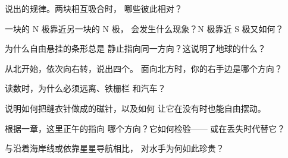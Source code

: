 \begin{exercise}[$\star$]\label{exo:g4:magnets-and-compass:2}
说出的规律。两块相互吸合时，
哪些彼此相对？
\end{exercise}

\begin{exercise}[$\star$]\label{exo:g4:magnets-and-compass:3}
一块的 N 极靠近另一块的 N 极，
会发生什么现象？N 极靠近 S 极又如何？
\end{exercise}

\begin{exercise}[$\star$]\label{exo:g4:magnets-and-compass:4}
为什么自由悬挂的条形总是
静止指向同一方向？这说明了地球的什么？
\end{exercise}

\begin{exercise}[$\star$]\label{exo:g4:magnets-and-compass:5}
从北开始，依次向右转，说出四个。
面向北方时，你的右手边是哪个方向？
\end{exercise}

\begin{exercise}[$\star$]\label{exo:g4:magnets-and-compass:6}
读数时，为什么必须远离、铁栅栏
和汽车？
\end{exercise}

\begin{exercise}[$\star$]\label{exo:g4:magnets-and-compass:7}
说明如何把缝衣针做成的磁针，以及如何
让它在没有时也能自由摆动。
\end{exercise}

\begin{exercise}[$\star$]\label{exo:g4:magnets-and-compass:8}
根据一章，这里正午的指向
哪个方向？它如何检验——
或在丢失时代替它？
\end{exercise}

\begin{exercise}[$\star$]\label{exo:g4:magnets-and-compass:9}
与沿着海岸线或依靠星星导航相比，
对水手为何如此珍贵？
\end{exercise}

